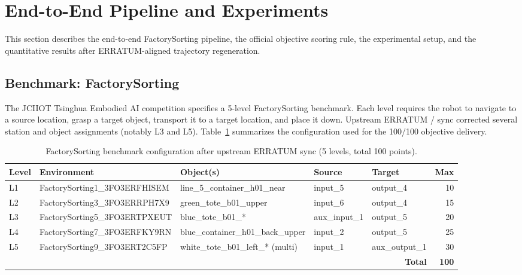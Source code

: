 \section{End-to-End Pipeline and Experiments}
\label{sec:experiments}

This section describes the end-to-end FactorySorting pipeline, the official objective scoring rule, the experimental setup, and the quantitative results after ERRATUM-aligned trajectory regeneration.

\subsection{Benchmark: FactorySorting}
\label{sec:experiments:benchmark}

The JCIIOT Tsinghua Embodied AI competition specifies a 5-level FactorySorting benchmark. Each level requires the robot to navigate to a source location, grasp a target object, transport it to a target location, and place it down. Upstream ERRATUM / sync corrected several station and object assignments (notably L3 and L5). Table~\ref{tab:benchmark} summarizes the configuration used for the 100/100 objective delivery.

\begin{table}[h]
\centering
\caption{FactorySorting benchmark configuration after upstream ERRATUM sync (5 levels, total 100 points).}
\label{tab:benchmark}
\small
\begin{tabular}{l l l l l r}
\toprule
\textbf{Level} & \textbf{Environment} & \textbf{Object(s)} & \textbf{Source} & \textbf{Target} & \textbf{Max} \\
\midrule
L1 & FactorySorting1\_3FO3ERFHISEM & line\_5\_container\_h01\_near & input\_5 & output\_4 & 10 \\
L2 & FactorySorting3\_3FO3ERRPH7X9 & green\_tote\_b01\_upper & input\_6 & output\_4 & 15 \\
L3 & FactorySorting5\_3FO3ERTPXEUT & blue\_tote\_b01\_* & aux\_input\_1 & output\_5 & 20 \\
L4 & FactorySorting7\_3FO3ERFKY9RN & blue\_container\_h01\_back\_upper & input\_2 & output\_5 & 25 \\
L5 & FactorySorting9\_3FO3ERT2C5FP & white\_tote\_b01\_left\_* (multi) & input\_1 & aux\_output\_1 & 30 \\
\midrule
\multicolumn{5}{r}{\textbf{Total}} & \textbf{100} \\
\bottomrule
\end{tabular}
\end{table}

